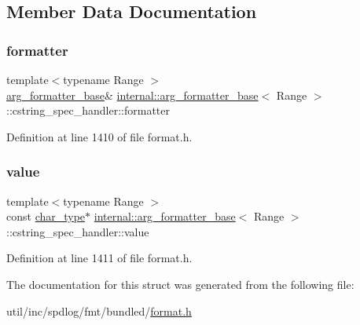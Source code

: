 \subsection{Member Data Documentation}
\mbox{\label{structinternal_1_1arg__formatter__base_1_1cstring__spec__handler_af912858b1370073e2e1a525dcd2bf923}} 
\subsubsection{\texorpdfstring{formatter}{formatter}}
{\footnotesize\ttfamily template$<$typename Range $>$ \\
\hyperlink{classinternal_1_1arg__formatter__base}{arg\+\_\+formatter\+\_\+base}\& \hyperlink{classinternal_1_1arg__formatter__base}{internal\+::arg\+\_\+formatter\+\_\+base}$<$ Range $>$\+::cstring\+\_\+spec\+\_\+handler\+::formatter}



Definition at line 1410 of file format.\+h.

\mbox{\label{structinternal_1_1arg__formatter__base_1_1cstring__spec__handler_a9aa3e2164e2360a14f7337c85857643c}} 
\subsubsection{\texorpdfstring{value}{value}}
{\footnotesize\ttfamily template$<$typename Range $>$ \\
const \hyperlink{classinternal_1_1arg__formatter__base_a407930bf282880d2ca45dfa8f5d2034b}{char\+\_\+type}$\ast$ \hyperlink{classinternal_1_1arg__formatter__base}{internal\+::arg\+\_\+formatter\+\_\+base}$<$ Range $>$\+::cstring\+\_\+spec\+\_\+handler\+::value}



Definition at line 1411 of file format.\+h.



The documentation for this struct was generated from the following file\+:\begin{DoxyCompactItemize}
\item 
util/inc/spdlog/fmt/bundled/\hyperlink{format_8h}{format.\+h}\end{DoxyCompactItemize}
